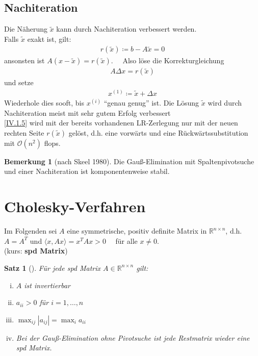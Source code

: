 \documentclass[ngerman,fontsize=11pt, paper=a4, parskip=half, titlepage=true, toc=bib]{scrbook}
\theoremstyle{definition}
\newtheorem{Bem}[Def]{Bemerkung}	%
\theoremstyle{plain}
\newtheorem{Satz}[Def]{Satz}		%
\newcommand{\Renn}{\mathds{R}^{n\times n}}
\newcommand{\sectione}[1]{ \setcounter{equation}{0}\section{#1}}
\newcommand{\subsectione}[1]{\addtocounter{Def}{1}\subsection{#1}}
\newenvironment{Satze}[1][]{ %
  \begin{Satz}[#1]
  }
  {
  \end{Satz}
  \addtocounter{subsection}{1}
}
\newenvironment{Beme}[1][]{ %
  \begin{Bem}[#1]
  }
  {
  \end{Bem}
  \addtocounter{subsection}{1}
}
\begin{document}
\subsectione{Nachiteration} 
Die Näherung $\widetilde{x}$ kann durch Nachiteration verbessert werden. \\
Falls $\widetilde{x}$ exakt ist, gilt:
\begin{gather}
  r(\widetilde{x}) \coloneqq b-A\widetilde{x} =0 \label{IV.1.4}
\end{gather}
ansonsten ist $A(x-\widetilde{x})=r(\widetilde{x}).$ \ \
Also löse die Korrekturgleichung
\begin{gather}
  A\Delta x = r(\widetilde{x}) 	\label{IV.1.5}
\end{gather}
und setze
\begin{gather*}
  x^{(1)} \coloneqq \widetilde{x} +\Delta x
\end{gather*}
Wiederhole dies sooft, bis $x^{(i)}$ \enquote{genau genug} ist.
Die Lösung $\widetilde{x}$ wird durch Nachiteration meist mit sehr gutem Erfolg verbessert
\cite[genaueres in ][]{dahmenreusken}\\
\eqref{IV.1.5} wird mit der bereits vorhandenen LR-Zerlegung
nur mit der neuen rechten Seite $r(\widetilde{x})$ gelöst, 
d.h. eine vorwärts und eine Rückwärtssubstitution
mit $\mathcal{O}(n^2)$ flops.

\begin{Beme}[nach Skeel 1980]
  Die Gauß-Elimination mit Spaltenpivotsuche und einer Nachiteration
  ist komponentenweise stabil.
\end{Beme}


\sectione{Cholesky-Verfahren}
Im Folgenden sei $A$ eine symmetrische, positiv definite Matrix in $\Renn $, d.h.
$A=A^T$ und $\langle x, Ax \rangle = x^TAx > 0 \quad $ für alle $ x\neq 0$. \\
(kurs: \textbf{spd Matrix}) \index{spd Matrix}

\begin{Satze}
  \label{4.2.1}
  Für jede spd Matrix $A\in \Renn $ gilt:
  \begin{enumerate}[i)]	
  \item $A$ ist invertierbar
  \item $a_{ii}>0$ für $i=1, \dots , n$
  \item $\max_{ij}|a_{ij}| = \max_{i}a_{ii}$
  \item Bei der Gauß-Elimination ohne Pivotsuche ist jede Restmatrix wieder eine spd Matrix.
  \end{enumerate}
\end{Satze}
\end{document}

